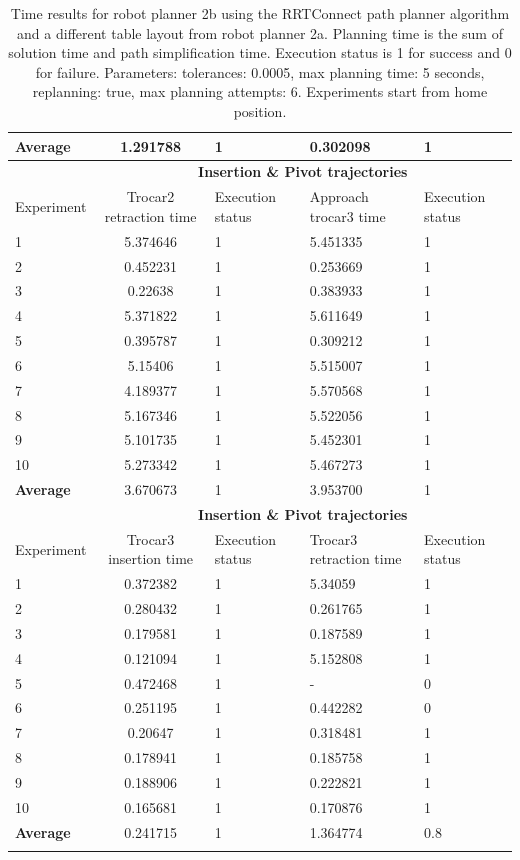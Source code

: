 \begin{longtable}{|p{2cm}|c|p{2cm}|p{2cm}|p{2cm}|}
\hline
\textbf{Average} & 1.291788	& 1	& 0.302098	& 1 \\
\hline
                          & \multicolumn{4}{c}{\textbf{Insertion \& Pivot trajectories}}                     \vline \\
\hline
Experiment                & Trocar2 retraction time & Execution status & Approach trocar3 time & Execution status  \\
\hline
1 & 5.374646	& 1	& 5.451335	& 1 \\
2 & 0.452231	& 1	& 0.253669	& 1 \\
3 & 0.22638	& 1	& 0.383933	& 1 \\
4 & 5.371822	& 1	& 5.611649	& 1 \\
5 & 0.395787	& 1	& 0.309212	& 1 \\
6 & 5.15406	& 1	& 5.515007	& 1 \\
7 & 4.189377	& 1	& 5.570568	& 1 \\
8 & 5.167346	& 1	& 5.522056	& 1 \\
9 & 5.101735	& 1	& 5.452301	& 1 \\
10  & 5.273342	& 1	& 5.467273	& 1 \\
\hline
\textbf{Average} & 3.670673	& 1	& 3.953700	& 1 \\
\hline
                          & \multicolumn{4}{c}{\textbf{Insertion \& Pivot trajectories}}                     \vline \\
\hline
Experiment                & Trocar3 insertion time & Execution status & Trocar3 retraction time & Execution status  \\
\hline
1 & 0.372382	& 1	& 5.34059	& 1 \\
2 & 0.280432	& 1	& 0.261765	& 1 \\
3 & 0.179581	& 1	& 0.187589	& 1 \\
4 & 0.121094	& 1	& 5.152808	& 1 \\
5 & 0.472468	& 1	& -	& 0 \\
6 & 0.251195	& 1	& 0.442282	& 0 \\
7 & 0.20647	& 1	& 0.318481	& 1 \\
8 & 0.178941	& 1	& 0.185758	& 1 \\
9 & 0.188906	& 1	& 0.222821	& 1 \\
10  & 0.165681	& 1	& 0.170876	& 1 \\
\hline
\textbf{Average} & 	0.241715  &	1 &	1.364774 &	0.8 \\
\hline
\caption{Time results for robot planner 2b using the RRTConnect path planner algorithm and a different table layout from robot planner 2a. Planning time is the sum of solution time and path simplification time. Execution status is 
1 for success and 0 for failure. Parameters: tolerances: 0.0005, max planning time: 5 seconds, replanning: true, max planning attempts: 6. Experiments start from home position.}
\label{robot-planner2b-rrtconnect-data}
\end{longtable}


